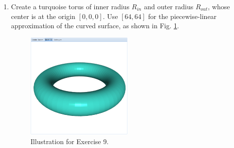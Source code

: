 \documentclass{article}
\begin{document}
\begin{enumerate}
\item Create a turquoise torus of inner radius $R_{in}$ and outer radius $R_{out}$, whose center 
is at the origin $[0, 0, 0]$. Use $[64, 64]$ for the piecewise-linear approximation 
of the curved surface, as shown in Fig. \ref{fig:a9}.


\begin{figure}[!ht]
\begin{center}
\includegraphics[width=0.5\textwidth]{img/a9-turquoise-torus.png}
\end{center}
\vspace{-2mm}
\caption{Illustration for Exercise 9.}
\label{fig:a9}
\vspace{-1cm}
\end{figure}

\end{enumerate}
\end{document}
